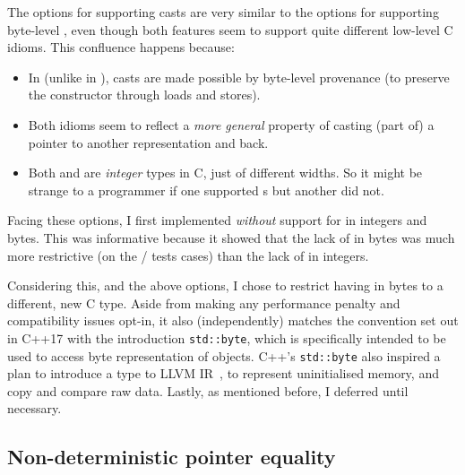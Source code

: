 The options for supporting  casts are very similar to the
options for supporting byte-level , even though both features
seem to support quite different low-level C idioms. This confluence happens
because:
\begin{itemize}
    \item In  (unlike in ),  casts are made
        possible by byte-level provenance (to preserve the 
        constructor through loads and stores).
    \item Both idioms seem to reflect a \emph{more general } property
        of casting (part of) a pointer to another representation and back.
    \item Both  and  are \emph{integer} types in
        C, just of different widths. So it might be strange to a programmer if
        one supported s but another did not.
\end{itemize}

Facing these options, I first implemented  \emph{without} support for
 in integers and bytes. This was informative because it showed
that the lack of  in bytes was much more restrictive (on the
/ tests cases) than the lack of  in
integers.

Considering this, and the above options, I chose to restrict having
 in bytes to a different, new C type. Aside from making any
performance penalty and compatibility issues opt-in, it also (independently)
matches the convention set out in C++17 with the introduction
\texttt{std::byte}, which is specifically intended to be used to
access byte representation of objects. C++'s \texttt{std::byte} also
inspired a plan to introduce a  type to LLVM
IR~, to represent uninitialised memory, and copy
and compare raw data. Lastly, as mentioned before, I deferred  until necessary.

\subsection{Non-deterministic pointer equality}\label{subsec:non-det-ptr-eq}


